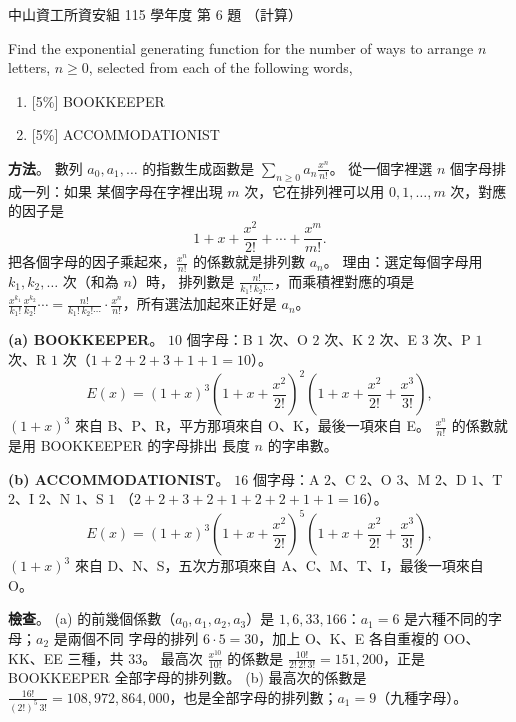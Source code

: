 \begin{pastexam}[label={px:nsysu-115-dmalg-05}]{中山資工所資安組 115 學年度 第 6 題}
（計算）

Find the exponential generating function for the number of ways to arrange $n$ letters, $n\ge 0$, selected from each of the following words,
\begin{enumerate}[label=(\alph*)]
\item {[}5\%{]} BOOKKEEPER
\item {[}5\%{]} ACCOMMODATIONIST
\end{enumerate}
\end{pastexam}

\begin{pastsoln}
\textbf{方法}。 數列 $a_0, a_1, \ldots$ 的指數生成函數是 $\sum_{n \ge 0} a_n \frac{x^n}{n!}$。 從一個字裡選 $n$ 個字母排成一列：如果
某個字母在字裡出現 $m$ 次，它在排列裡可以用 $0, 1, \ldots, m$ 次，對應的因子是
\[
1 + x + \frac{x^2}{2!} + \cdots + \frac{x^m}{m!} .
\]
把各個字母的因子乘起來，$\frac{x^n}{n!}$ 的係數就是排列數 $a_n$。 理由：選定每個字母用 $k_1, k_2, \ldots$ 次（和為 $n$）時，
排列數是 $\frac{n!}{k_1! \, k_2! \cdots}$，而乘積裡對應的項是 $\frac{x^{k_1}}{k_1!} \frac{x^{k_2}}{k_2!} \cdots
= \frac{n!}{k_1! \, k_2! \cdots} \cdot \frac{x^n}{n!}$，所有選法加起來正好是 $a_n$。

\textbf{(a) BOOKKEEPER}。 $10$ 個字母：B $1$ 次、O $2$ 次、K $2$ 次、E $3$ 次、P $1$ 次、R $1$ 次（$1 + 2 + 2 + 3 + 1 + 1 = 10$）。
\[
E(x) = (1 + x)^3 \left(1 + x + \frac{x^2}{2!}\right)^2 \left(1 + x + \frac{x^2}{2!} + \frac{x^3}{3!}\right),
\]
$(1 + x)^3$ 來自 B、P、R，平方那項來自 O、K，最後一項來自 E。 $\frac{x^n}{n!}$ 的係數就是用 BOOKKEEPER 的字母排出
長度 $n$ 的字串數。

\textbf{(b) ACCOMMODATIONIST}。 $16$ 個字母：A $2$、C $2$、O $3$、M $2$、D $1$、T $2$、I $2$、N $1$、S $1$
（$2 + 2 + 3 + 2 + 1 + 2 + 2 + 1 + 1 = 16$）。
\[
E(x) = (1 + x)^3 \left(1 + x + \frac{x^2}{2!}\right)^5 \left(1 + x + \frac{x^2}{2!} + \frac{x^3}{3!}\right),
\]
$(1 + x)^3$ 來自 D、N、S，五次方那項來自 A、C、M、T、I，最後一項來自 O。

\textbf{檢查}。 (a) 的前幾個係數（$a_0, a_1, a_2, a_3$）是 $1, 6, 33, 166$：$a_1 = 6$ 是六種不同的字母；$a_2$ 是兩個不同
字母的排列 $6 \cdot 5 = 30$，加上 O、K、E 各自重複的 OO、KK、EE 三種，共 $33$。 最高次 $\frac{x^{10}}{10!}$ 的係數是
$\frac{10!}{2! \, 2! \, 3!} = 151{,}200$，正是 BOOKKEEPER 全部字母的排列數。 (b) 最高次的係數是
$\frac{16!}{(2!)^5 \, 3!} = 108{,}972{,}864{,}000$，也是全部字母的排列數；$a_1 = 9$（九種字母）。
\end{pastsoln}
